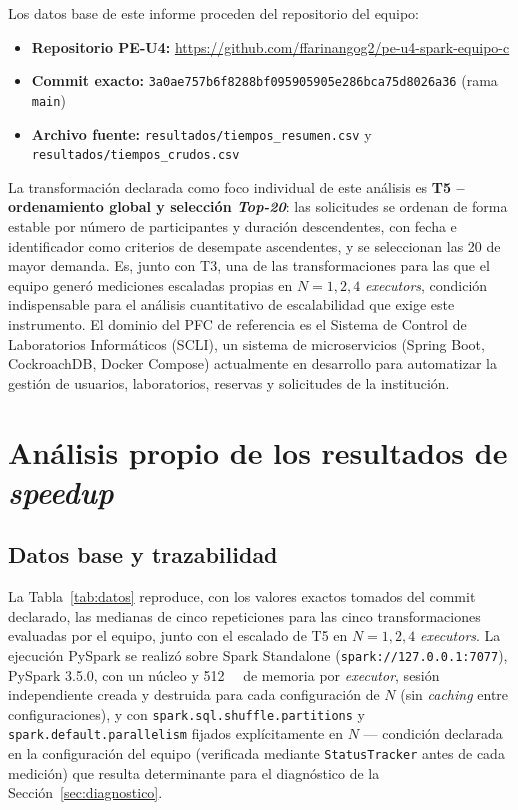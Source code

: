 \documentclass[10pt,conference]{IEEEtran}
\begin{document}
Los datos base de este informe proceden del repositorio del equipo:
\begin{itemize}
  \item \textbf{Repositorio PE-U4:} \url{https://github.com/ffarinangog2/pe-u4-spark-equipo-c}
  \item \textbf{Commit exacto:} {\small\texttt{3a0ae757\-b6f8288b\-f0959059\-05e286bc\-a75d8026a36}} (rama \texttt{main})
  \item \textbf{Archivo fuente:} \texttt{resultados/tiempos\_resumen.csv} y \texttt{resultados/tiempos\_crudos.csv}
\end{itemize}

La transformación declarada como foco individual de este análisis es \textbf{T5 -- ordenamiento global y selección \textit{Top-20}}: las solicitudes se ordenan de forma estable por número de participantes y duración descendentes, con fecha e identificador como criterios de desempate ascendentes, y se seleccionan las 20 de mayor demanda. Es, junto con T3, una de las transformaciones para las que el equipo generó mediciones escaladas propias en $N=1,2,4$ \textit{executors}, condición indispensable para el análisis cuantitativo de escalabilidad que exige este instrumento. El dominio del PFC de referencia es el Sistema de Control de Laboratorios Informáticos (SCLI), un sistema de microservicios (Spring Boot, CockroachDB, Docker Compose) actualmente en desarrollo para automatizar la gestión de usuarios, laboratorios, reservas y solicitudes de la institución.

\section{Análisis propio de los resultados de \textit{speedup}}
\label{sec:analisis}
\subsection{Datos base y trazabilidad}

La Tabla~\ref{tab:datos} reproduce, con los valores exactos tomados del commit declarado, las medianas de cinco repeticiones para las cinco transformaciones evaluadas por el equipo, junto con el escalado de T5 en $N=1,2,4$ \textit{executors}. La ejecución PySpark se realizó sobre Spark Standalone (\texttt{spark://127.0.0.1:7077}), PySpark 3.5.0, con un núcleo y \SI{512}{\mebi\byte} de memoria por \textit{executor}, sesión independiente creada y destruida para cada configuración de $N$ (sin \textit{caching} entre configuraciones), y con \texttt{spark.sql.shuffle.partitions} y \texttt{spark.default.parallelism} fijados explícitamente en $N$ --- condición declarada en la configuración del equipo (verificada mediante \texttt{StatusTracker} antes de cada medición) que resulta determinante para el diagnóstico de la Sección~\ref{sec:diagnostico}.
\end{document}
